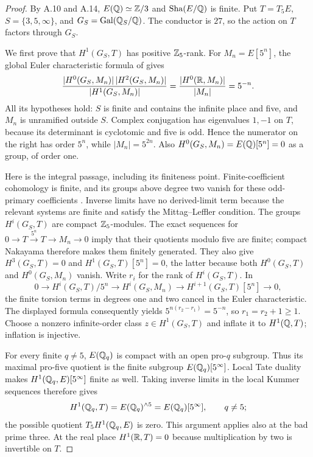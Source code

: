 \begin{proof}
By A.10 and A.14, $E(\mathbb Q)\simeq\mathbb Z/3$ and $\mathop{\mathrm{Sha}}(E/\mathbb Q)$ is finite.
Put $T=T_5E$, $S=\{3,5,\infty\}$, and
$G_S=\operatorname{Gal}(\mathbb Q_S/\mathbb Q)$. The conductor is $27$, so the
action on $T$ factors through $G_S$.

We first prove that $H^1(G_S,T)$ has positive $\mathbb Z_5$-rank. For
$M_n=E[5^n]$, the global Euler characteristic formula of
\citet[I, Theorem 5.1, p.67]{AMMilneADT2006} gives
\[
 \frac{|H^0(G_S,M_n)|\,|H^2(G_S,M_n)|}
      {|H^1(G_S,M_n)|}
 =\frac{|H^0(\mathbb R,M_n)|}{|M_n|}=5^{-n}.
\]
All its hypotheses hold: $S$ is finite and contains the infinite place
and five, and $M_n$ is unramified outside $S$.
Complex conjugation has eigenvalues $1,-1$ on $T$, because its
determinant is cyclotomic and five is odd. Hence the numerator on the
right has order $5^n$, while $|M_n|=5^{2n}$.
Also $H^0(G_S,M_n)=E(\mathbb Q)[5^n]=0$ as a group, of order one.

Here is the integral passage, including its finiteness point.
Finite-coefficient cohomology is finite, and its groups above degree
two vanish for these odd-primary coefficients
\citep[I, Theorem 4.10(c), Corollary 4.15]{AMMilneADT2006}.
Inverse limits have no derived-limit term because the relevant systems
are finite and satisfy the Mittag--Leffler condition. The groups
$H^i(G_S,T)$ are compact $\mathbb Z_5$-modules. The exact sequences for
$0\to T\xrightarrow{5^n}T\to M_n\to0$ imply that their quotients
modulo five are finite; compact Nakayama therefore makes them finitely
generated. They also give $H^3(G_S,T)=0$ and
$H^1(G_S,T)[5^n]=0$, the latter because both $H^0(G_S,T)$ and
$H^0(G_S,M_n)$ vanish. Write $r_i$ for the rank of $H^i(G_S,T)$.
In
\[
 0\longrightarrow H^i(G_S,T)/5^n
 \longrightarrow H^i(G_S,M_n)
 \longrightarrow H^{i+1}(G_S,T)[5^n]
 \longrightarrow0,
\]
the finite torsion terms in degrees one and two cancel in the Euler
characteristic. The displayed formula consequently yields
$5^{n(r_2-r_1)}=5^{-n}$, so $r_1=r_2+1\ge1$.
Choose a nonzero infinite-order class $z\in H^1(G_S,T)$ and inflate
it to $H^1(\mathbb Q,T)$; inflation is injective.

For every finite $q\ne5$, $E(\mathbb Q_q)$ is compact with an open pro-$q$
subgroup. Thus its maximal pro-five quotient is the finite subgroup
$E(\mathbb Q_q)[5^\infty]$. Local Tate duality
\citep[I, Corollary 3.4, p.43]{AMMilneADT2006} makes
$H^1(\mathbb Q_q,E)[5^\infty]$ finite as well. Taking inverse limits in
the local Kummer sequences therefore gives
\[
 H^1(\mathbb Q_q,T)=E(\mathbb Q_q)^{\wedge5}
            =E(\mathbb Q_q)[5^\infty],\qquad q\ne5;
\]
the possible quotient $T_5H^1(\mathbb Q_q,E)$ is zero. This argument applies
also at the bad prime three. At the real place
$H^1(\mathbb R,T)=0$ because multiplication by two is invertible on $T$.


\end{proof}

